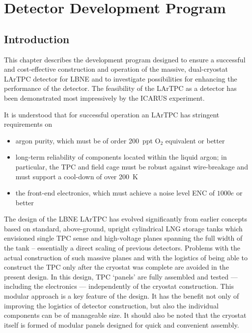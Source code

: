 %
%
\chapter{Detector Development Program}
\label{ch:randd}


\section{Introduction}
This chapter describes the development program designed to ensure a successful and cost-effective construction and operation of the massive, dual-cryostat LArTPC detector for LBNE and to investigate possibilities for enhancing the performance of the detector. The feasibility of the LArTPC as a detector has been demonstrated most impressively by the ICARUS experiment. 

It is understood that for successful operation an LArTPC has stringent requirements on
\begin{itemize}
 \item argon purity, which must be of order 200~ppt O$_2$ equivalent or better
 \item long-term reliability of components located within the liquid argon; in particular, the TPC and field cage must be robust against wire-breakage and must support a cool-down of over 200~K
 \item the front-end electronics, which must achieve a noise level ENC of $1000 e$ or better
\end{itemize}

The design of the LBNE LArTPC has evolved significantly from earlier concepts based on standard, above-ground, upright cylindrical LNG storage tanks which envisioned single TPC sense and high-voltage planes spanning the full width of the tank -- essentially a direct scaling of previous detectors. Problems with the actual construction of such massive planes and with the logistics of being able to construct the TPC only after the cryostat was complete are avoided in the present design. In this design,  TPC `panels'  are fully assembled and tested  --- including the electronics ---  independently of the cryostat construction. This modular approach is a key feature of the design. It has the benefit not only of improving the logistics of detector construction, but also the individual components can be of manageable size. It should also be noted that the cryostat itself is formed of modular panels designed for quick and convenient assembly.

